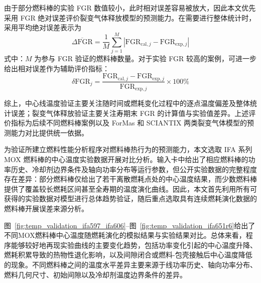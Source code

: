 由于部分燃料棒的实验 FGR 数值较小，此时相对误差容易被放大，因此本文优先采用 FGR 绝对误差评价裂变气体释放模型的预测能力。在需要进行整体统计时，采用平均绝对误差表示为
\begin{equation}
	\overline{\Delta \mathrm{FGR}} =
	\frac{1}{M}\sum_{j=1}^{M}
	\left|\mathrm{FGR}_{\mathrm{cal},j}-\mathrm{FGR}_{\mathrm{exp},j}\right|
\end{equation}
\noindent 式中：$M$ 为参与 FGR 验证的燃料棒数量。对于实验 FGR 较高的案例，可进一步给出相对误差作为辅助评价指标：
\begin{equation}
	\delta \mathrm{FGR}_j =
	\frac{\mathrm{FGR}_{\mathrm{cal},j}-\mathrm{FGR}_{\mathrm{exp},j}}
	{\mathrm{FGR}_{\mathrm{exp},j}}\times 100\%
\end{equation}

综上，中心线温度验证主要关注随时间或燃耗变化过程中的逐点温度偏差及整体统计误差；裂变气体释放验证主要关注寿期末 FGR 的计算值与实验值差异。上述评价指标为后续不同燃料棒案例以及 ForMas 和 SCIANTIX 两类裂变气体模型的预测能力对比提供统一依据。



为验证所建立燃料性能分析程序对燃料棒热行为的预测能力，本文选取 IFA 系列 MOX 燃料棒的中心温度实验数据开展对比分析。输入卡中给出了相应燃料棒的功率历史、冷却剂边界条件及轴向功率分布等运行参数，但公开实验数据的完整程度存在差异：部分燃料棒仅给出了若干离散燃耗点处的中心温度结果，而少数燃料棒提供了覆盖较长燃耗区间甚至全寿期的温度演化曲线。因此，本文首先利用所有可获得的实验数据对模型进行总体趋势验证，随后重点选取具有连续燃耗演化数据的燃料棒开展误差来源分析。

图~\ref{fig:temp_validation_ifa597_ifa606}--图~\ref{fig:temp_validation_ifa651r6}给出了不同MOX燃料棒中心温度随燃耗演化的模拟结果与实验结果对比。总体来看，程序能够较好地再现实验曲线的主要变化趋势，包括功率变化引起的中心温度升降、燃耗积累导致的热物性退化影响，以及间隙闭合或燃料-包壳接触后中心温度降低的现象。不同燃料棒之间的温度水平差异主要来源于线功率历史、轴向功率分布、燃料几何尺寸、初始间隙以及冷却剂温度边界条件的差异。


